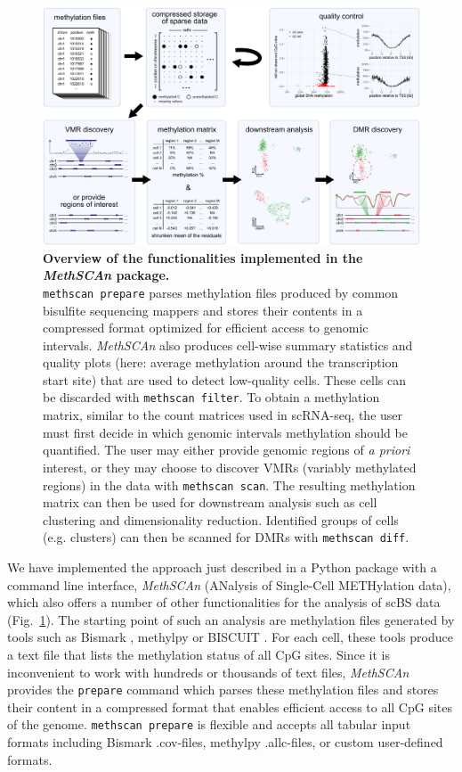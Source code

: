 \documentclass[twocolumn,10pt]{article}
\begin{document}
\begin{figure}[t]
    \begin{center}
        \includegraphics[width=.8\textwidth]{figures/Fig_workflow.png}
    \end{center}
    \caption{\small \textbf{Overview of the functionalities implemented in the \textit{MethSCAn} package.}\\
        \texttt{methscan prepare} parses methylation files produced by common bisulfite sequencing mappers and stores their contents in a compressed format optimized for efficient access to genomic intervals.
        \textit{MethSCAn} also produces cell-wise summary statistics and quality plots (here: average methylation around the transcription start site) that are used to detect low-quality cells.
        These cells can be discarded with \texttt{methscan filter}.
        To obtain a methylation matrix, similar to the count matrices used in scRNA-seq, the user must first decide in which genomic intervals methylation should be quantified.
        The user may either provide genomic regions of \emph{a priori} interest, or they may choose to discover VMRs (variably methylated regions) in the data with \texttt{methscan scan}.
        The resulting methylation matrix can then be used for downstream analysis such as cell clustering and dimensionality reduction.
        Identified groups of cells (e.g. clusters) can then be scanned for DMRs with \texttt{methscan diff}.
    }
    \label{fig:workflow}
\end{figure}

We have implemented the approach just described in a Python package with a command line interface, \textit{MethSCAn} (ANalysis of Single-Cell METHylation data), which also offers a number of other functionalities for the analysis of scBS data (Fig.~\ref{fig:workflow}).
The starting point of such an analysis are methylation files generated by tools such as Bismark \citep{bismark}, methylpy \citep{methylpy} or BISCUIT \citep{biscuit}.
For each cell, these tools produce a text file that lists the methylation status of all CpG sites.
Since it is inconvenient to work with hundreds or thousands of text files, \textit{MethSCAn} provides the \texttt{prepare} command which parses these methylation files and stores their content in a compressed format that enables efficient access to all CpG sites of the genome.
\texttt{methscan prepare} is flexible and accepts all tabular input formats including Bismark .cov-files, methylpy .allc-files, or custom user-defined formats.
\end{document}
